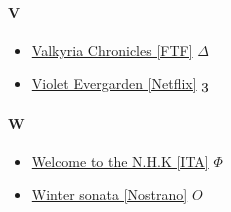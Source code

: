 		\paragraph{V} \hypertarget{SV}{}
			\begin{itemize}
			
				\item \href{https://mega.nz/#F!qdx2mIwY!a5V6KcMUPqwjbMXn-3Q0eg} {Valkyria Chronicles [FTF]}  $\Delta$ \\ 
				\item \href{https://mega.nz/#F!eXAiEIBT!Rxi21bByAlqMEGWvNKYzRg} {Violet Evergarden [Netflix]}  $\oldstylenums{3}$ \\ 
			
			\end{itemize}
		
		\paragraph{W} \hypertarget{SW}{}
			\begin{itemize}
				
				\item \href{https://mega.nz/#F!AWBCgQBI!-Y0QVKz8T5XMSarNzKrtJQ} {Welcome to the N.H.K [ITA]}  $\Phi$ \\ 
				\item \href{https://mega.nz/#F!c65DzLSJ!4t8c3taSbf38yd6cVbVvhQ} {Winter sonata [Nostrano]}  $O$ \\ 
				
			\end{itemize}
			